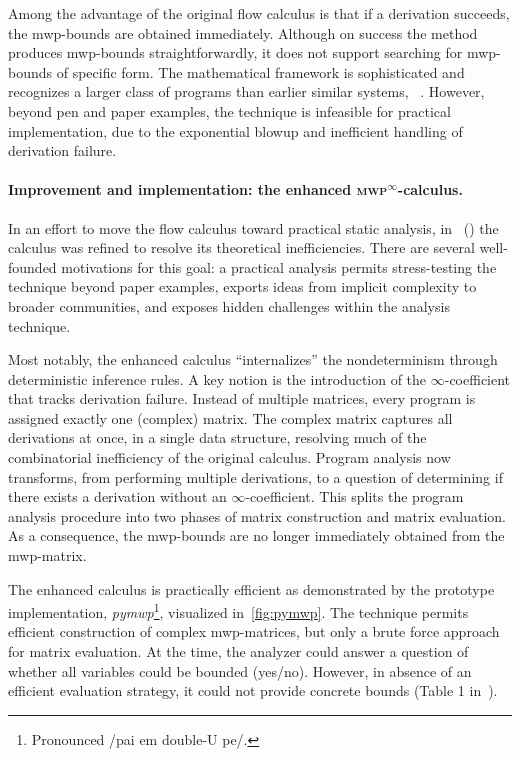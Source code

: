 Among the advantage of the original flow calculus is that if a derivation succeeds, the mwp-bounds are obtained immediately.
Although on success the method produces mwp-bounds straightforwardly, it does not support searching for mwp-bounds of specific form.
The mathematical framework is sophisticated and recognizes a larger class of programs than earlier similar systems, \eg~\cite{niggl2006}.
However, beyond pen and paper examples, the technique is infeasible for practical implementation, due to the exponential blowup and inefficient handling of derivation failure.

\paragraph*{Improvement and implementation: the enhanced \textsc{mwp}\(^\infty\)-calculus.}
In an effort to move the flow calculus toward practical static analysis,
in~\cite{aubert20222} () the calculus was refined to resolve its theoretical inefficiencies.
There are several well-founded motivations for this goal:
a practical analysis permits stress-testing the technique beyond paper examples, exports ideas from implicit complexity to broader communities, and exposes hidden challenges within the analysis technique.

Most notably, the enhanced calculus \enquote{internalizes} the nondeterminism through deterministic inference rules.
A key notion is the introduction of the \(\infty\)-coefficient that tracks derivation failure.
Instead of multiple matrices, every program is assigned exactly one (complex) matrix.
The complex matrix captures all derivations at once, in a single data structure, resolving much of the combinatorial inefficiency of the original calculus.
Program analysis now transforms, from performing multiple derivations, to a question of determining if there exists a derivation without an \(\infty\)-coefficient.
This splits the program analysis procedure into two phases of matrix construction and matrix evaluation.
As a consequence, the mwp-bounds are no longer immediately obtained from the mwp-matrix.

The enhanced calculus is practically efficient as demonstrated by the prototype implementation, \emph{pymwp}\footnote{Pronounced /pai em double-U pe/.}, visualized in~\autoref{fig:pymwp}.
The technique permits efficient construction of complex mwp-matrices, but only a brute force approach for matrix evaluation.
At the time, the analyzer could answer a question of whether all variables could be bounded (yes/no).
However, in absence of an efficient evaluation strategy, it could not provide concrete bounds (\cf Table 1 in~).

